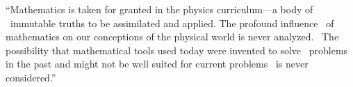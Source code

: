 \documentclass[preview]{standalone}
\begin{document}
\begin{justify}
``Mathematics is taken for granted in the physics curriculum—a body of \n \
                        immutable truths to be assimilated and applied. The profound influence \n \
                        of mathematics on our conceptions of the physical world is never analyzed. \n \
                        The possibility that mathematical tools used today were invented to solve \n \
                        problems in the past and might not be well suited for current problems \n \
                        is never considered.''
\end{justify}
\end{document}
